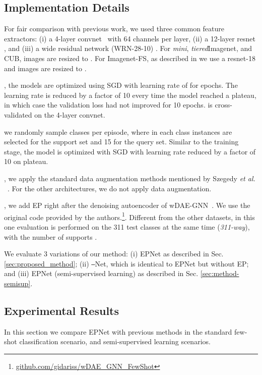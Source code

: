 \documentclass[runningheads]{llncs}
\begin{document}
\subsection{Implementation Details}
 For fair comparison with previous work, we used three common feature extractors: (i) a 4-layer convnet~\cite{vinyals2016matching,snell2017prototypical} with 64 channels per layer, (ii) a 12-layer resnet \cite{oreshkin2018tadam}, and (iii) a wide residual network (WRN-28-10) \cite{rusu2018meta,Zagoruyko2016WRN}. For \textit{mini}, \textit{tiered}Imagenet, and CUB, images are resized to . For Imagenet-FS, as described in \cite{gidaris2019boosting,gidaris2018dynamic} we use a resnet-18 and images are resized to .\smallskip
 
, the models are optimized using SGD with learning rate of  for  epochs. The learning rate is reduced by a factor of 10 every time the model reached a plateau, in which case the validation loss had not improved for 10 epochs.  is cross-validated on the 4-layer convnet.\smallskip

 we randomly sample  classes per episode, where in each class  instances are selected for the support set and 15 for the query set.
Similar to the training stage, the model is optimized with SGD with learning rate  reduced by a factor of 10 on plateau.  \smallskip

, we apply the standard data augmentation methods mentioned by Szegedy \emph{et al.} ~\cite{szegedy2015going,rusu2018meta}. For the other architectures, we do not apply data augmentation.\smallskip

, we add EP right after the denoising autoencoder of wDAE-GNN~\cite{gidaris2019generating}. We use the original code provided by the authors.\footnote{\url{github.com/gidariss/wDAE\_GNN\_FewShot}}. Different from the other datasets, in this one evaluation is performed on the 311 test classes at the same time (\textit{311-way}), with the number of supports . \smallskip

We evaluate 3 variations of our method: (i) EPNet as described in Sec. \ref{sec:proposed_method}; (ii) \texttt{--}Net, which is identical to EPNet but without EP; and (iii) EPNet (semi-supervised learning) as described in Sec. \ref{sec:method-semisup}. 

\subsection{Experimental Results}
In this section we compare EPNet with previous methods in the standard few-shot classification scenario, and semi-supervised learning scenarios. 
\end{document}
